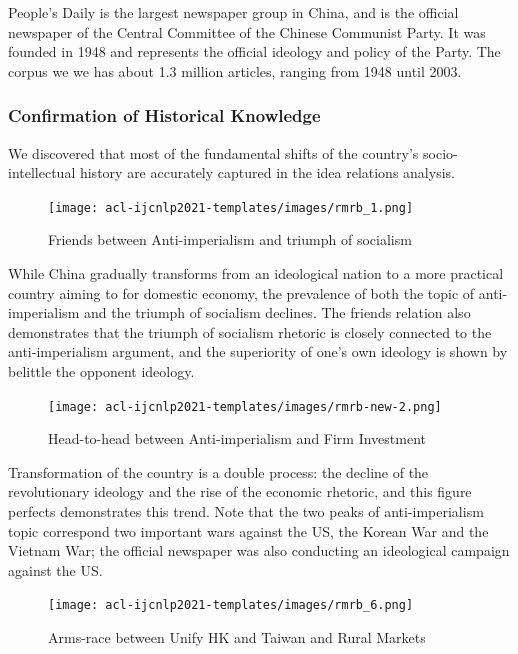 \documentclass{article}
\begin{document}
People's Daily is the largest newspaper group in China, and is the official newspaper of the Central Committee of the Chinese Communist Party. It was founded in 1948 and represents the official ideology and policy of the Party. The corpus we we has about 1.3 million articles, ranging from 1948 until 2003. 

\subsubsection{Confirmation of Historical Knowledge}

We discovered that most of the fundamental shifts of the country's socio-intellectual history are accurately captured in the idea relations analysis. 

\begin{figure}[h!] 
  \centering
  \texttt{[image: acl-ijcnlp2021-templates/images/rmrb\_1.png]}
  \caption{Friends between Anti-imperialism and triumph of socialism}
  \label{fig:aer-arms}
\end{figure}


While China gradually transforms from an ideological nation to a more practical country aiming to for domestic economy, the prevalence of both the topic of anti-imperialism and the triumph of socialism declines. The friends relation also demonstrates that the triumph of socialism rhetoric is closely connected to the anti-imperialism argument, and the superiority of one's own ideology is shown by belittle the opponent ideology.

\begin{figure}[h!] 
  \centering
  \texttt{[image: acl-ijcnlp2021-templates/images/rmrb-new-2.png]}
  \caption{Head-to-head between Anti-imperialism and Firm Investment}
  \label{fig:aer-arms}
\end{figure}


Transformation of the country is a double process: the decline of the revolutionary ideology and the rise of the economic rhetoric, and this figure perfects demonstrates this trend. Note that the two peaks of anti-imperialism topic correspond two important wars against the US, the Korean War and the Vietnam War; the official newspaper was also conducting an ideological campaign against the US. 

\begin{figure}[h!] 
  \centering
  \texttt{[image: acl-ijcnlp2021-templates/images/rmrb\_6.png]}
  \caption{Arms-race between Unify HK and Taiwan and Rural Markets}
  \label{fig:aer-arms}
\end{figure}
\end{document}
